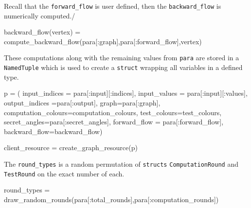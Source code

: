 \documentclass[
]{article}
\newenvironment{Shaded}{}{}
\newcommand{\FunctionTok}[1]{\textcolor[rgb]{0.02,0.16,0.49}{#1}}
\newcommand{\NormalTok}[1]{#1}
\newcommand{\OperatorTok}[1]{\textcolor[rgb]{0.40,0.40,0.40}{#1}}
\begin{document}
Recall that the \texttt{forward\_flow} is user defined, then the
\texttt{backward\_flow} is numerically computed./

\begin{Shaded}
\begin{Highlighting}[]
    \FunctionTok{backward\_flow}\NormalTok{(vertex) }\OperatorTok{=} \FunctionTok{compute\_backward\_flow}\NormalTok{(para[}\OperatorTok{:}\NormalTok{graph],para[}\OperatorTok{:}\NormalTok{forward\_flow],vertex)}
\end{Highlighting}
\end{Shaded}

These computations along with the remaining values from \texttt{para}
are stored in a \texttt{NamedTuple} which is used to create a
\texttt{struct} wrapping all variables in a defined type.

\begin{Shaded}
\begin{Highlighting}[]
\NormalTok{    p }\OperatorTok{=}\NormalTok{ (}
\NormalTok{        input\_indices }\OperatorTok{=}\NormalTok{  para[}\OperatorTok{:}\NormalTok{input][}\OperatorTok{:}\NormalTok{indices],}
\NormalTok{        input\_values }\OperatorTok{=}\NormalTok{ para[}\OperatorTok{:}\NormalTok{input][}\OperatorTok{:}\NormalTok{values],}
\NormalTok{        output\_indices }\OperatorTok{=}\NormalTok{para[}\OperatorTok{:}\NormalTok{output],}
\NormalTok{        graph}\OperatorTok{=}\NormalTok{para[}\OperatorTok{:}\NormalTok{graph],}
\NormalTok{        computation\_colours}\OperatorTok{=}\NormalTok{computation\_colours,}
\NormalTok{        test\_colours}\OperatorTok{=}\NormalTok{test\_colours,}
\NormalTok{        secret\_angles}\OperatorTok{=}\NormalTok{para[}\OperatorTok{:}\NormalTok{secret\_angles],}
\NormalTok{        forward\_flow }\OperatorTok{=}\NormalTok{ para[}\OperatorTok{:}\NormalTok{forward\_flow],}
\NormalTok{        backward\_flow}\OperatorTok{=}\NormalTok{backward\_flow)}
        
\NormalTok{    client\_resource }\OperatorTok{=} \FunctionTok{create\_graph\_resource}\NormalTok{(p)}
\end{Highlighting}
\end{Shaded}

The \texttt{round\_types} is a random permutation of \texttt{structs}
\texttt{ComputationRound} and \texttt{TestRound} on the exact number of
each.

\begin{Shaded}
\begin{Highlighting}[]
\NormalTok{    round\_types }\OperatorTok{=} \FunctionTok{draw\_random\_rounds}\NormalTok{(para[}\OperatorTok{:}\NormalTok{total\_rounds],para[}\OperatorTok{:}\NormalTok{computation\_rounds])}
\end{Highlighting}
\end{Shaded}
\end{document}
